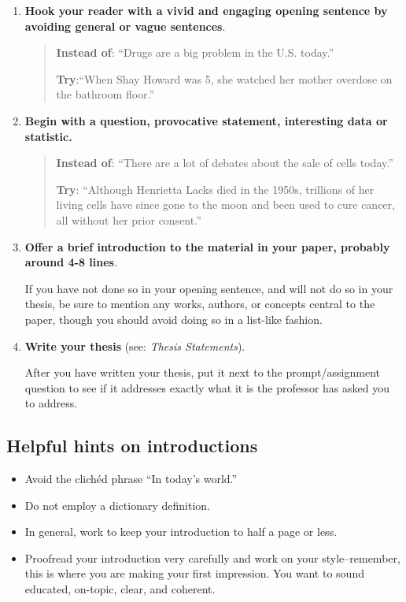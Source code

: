 \begin{enumerate}
\item \textbf{Hook your reader with a vivid and engaging opening sentence by avoiding general or vague sentences}.
        	               	        	
\begin{quote}

\textbf{Instead of}: ``Drugs are a big problem in the U.S. today.''

\textbf{Try}:``When Shay Howard was 5, she watched her mother
overdose on  the bathroom floor.''
\end{quote}
        	    	
\item {\textbf{Begin with a question, provocative statement, interesting data or statistic.}}

\begin{quote}
                            	                   
\textbf{Instead of}: ``There are a lot of debates about the sale of cells today.''

\textbf{Try}: ``Although Henrietta Lacks died in the 1950s, trillions
      of her living cells have since gone to the moon and  
      been used to cure cancer, all without her prior
      consent.''     
\end{quote}
                    	 
\item \textbf{Offer a brief introduction to the material in your paper, probably around 4-8 lines}. 

If you have not done so in your opening sentence, and will not do so in your thesis, be sure to mention any works, authors, or concepts central to the paper, though you should avoid doing so in a list-like fashion.
 
\item \textbf{Write your thesis} (see: \emph{Thesis Statements}).

After you have written your thesis, put it next to the prompt/assignment question to see if it addresses exactly what it is the professor has asked you to address.  
  
 \end{enumerate}

 
\subsection{Helpful hints on introductions}

\begin{itemize}
\item Avoid the clich\'ed phrase ``In today's world.''
        	
\item Do not employ a dictionary definition.
       	
\item In general, work to keep your introduction to half a page or less.    	  
 
\item Proofread your introduction very carefully and work on your style--remember, this is where you are making your first impression. You want to sound educated, on-topic, clear, and coherent.
 \end{itemize}
